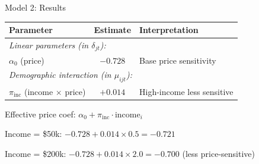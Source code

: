 \documentclass[notes,11pt, aspectratio=169]{beamer}
\newenvironment{wideitemize}{\itemize\addtolength{\itemsep}{10pt}}{\enditemize}
\begin{document}
\begin{frame}{Model 2: Results}
	\begin{center}
		\begin{tabular}{lcl}
			\toprule
			\textbf{Parameter} & \textbf{Estimate} & \textbf{Interpretation} \\
			\midrule
			\multicolumn{3}{l}{\textit{Linear parameters (in $\delta_{jt}$):}} \\
			$\alpha_0$ (price) & $-0.728$ & Base price sensitivity \\
			\midrule
			\multicolumn{3}{l}{\textit{Demographic interaction (in $\mu_{ijt}$):}} \\
			$\pi_{\text{inc}}$ (income $\times$ price) & $+0.014$ & High-income less sensitive \\
			\bottomrule
		\end{tabular}
	\end{center}
	\vspace{5pt}
	\begin{wideitemize}
		\item Effective price coef: $\alpha_0 + \pi_{\text{inc}} \cdot \text{income}_i$
		\item Income = \$50k: $-0.728 + 0.014 \times 0.5 = -0.721$
		\item Income = \$200k: $-0.728 + 0.014 \times 2.0 = -0.700$ (less price-sensitive)
	\end{wideitemize}
\end{frame}

\end{document}
